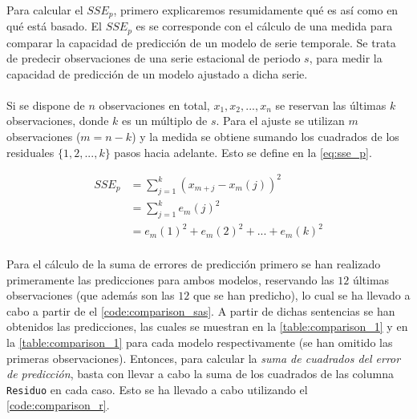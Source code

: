 \documentclass[a4paper, spanish]{article}
\begin{document}
    \paragraph{}
    Para calcular el $SSE_p$, primero explicaremos resumidamente qué es así como en qué está basado. El $SSE_p$ es se corresponde con el cálculo de una medida para comparar la capacidad de predicción de un modelo de serie temporale. Se trata de predecir observaciones de una serie estacional de periodo $s$, para medir la capacidad de predicción de un modelo ajustado a dicha serie.

    \paragraph{}
    Si se dispone de $n$ observaciones en total, $x_1, x_2, ..., x_n$ se reservan las últimas $k$ observaciones, donde $k$ es un múltiplo de $s$. Para el ajuste se utilizan $m$ observaciones ($m = n - k$) y la medida se obtiene sumando los cuadrados de los residuales $\{1, 2, ..., k\}$ pasos hacia adelante. Esto se define en la \autoref{eq:sse_p}.

    \begin{equation}
    \label{eq:sse_p}
      \begin{split}
        SSE_p
        &= \sum_{j = 1} ^ k (x_{m + j} - x_{m}(j)) ^ 2 \\
        &= \sum_{j = 1} ^ k e_m(j) ^ 2 \\
        &= e_m(1) ^ 2 + e_m(2) ^ 2 + ... + e_m(k) ^ 2
      \end{split}
    \end{equation}

    \paragraph{}
    Para el cálculo de la suma de errores de predicción primero se han realizado primeramente las predicciones para ambos modelos, reservando las $12$ últimas observaciones (que además son las $12$ que se han predicho), lo cual se ha llevado a cabo a partir de el \autoref{code:comparison_sas}. A partir de dichas sentencias se han obtenidos las predicciones, las cuales se muestran en la \autoref{table:comparison_1} y en la \autoref{table:comparison_1} para cada modelo respectivamente (se han omitido las primeras observaciones). Entonces, para calcular la \emph{suma de cuadrados del error de predicción}, basta con llevar a cabo la suma de los cuadrados de las columna \texttt{Residuo} en cada caso. Esto se ha llevado a cabo utilizando el \autoref{code:comparison_r}.
\end{document}
